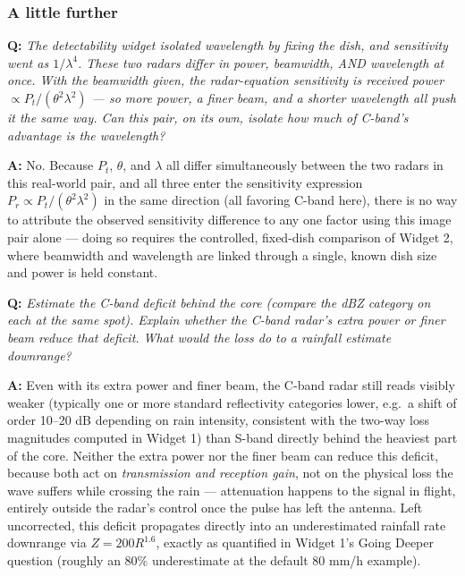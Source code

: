 \documentclass[11pt]{article}
\newenvironment{qa}[1]{\par\noindent\textbf{\color{qgray}Q: }\emph{#1}\par\noindent\textbf{A: }}{\par\vspace{6pt}}
\newcommand{\tier}[1]{\subsubsection*{#1}}
\begin{document}
\tier{A little further}
\begin{qa}{The detectability widget isolated wavelength by fixing the dish, and sensitivity went as $1/\lambda^4$. These two radars differ in power, beamwidth, AND wavelength at once. With the beamwidth given, the radar-equation sensitivity is received power $\propto P_t/(\theta^2\lambda^2)$ --- so more power, a finer beam, and a shorter wavelength all push it the same way. Can this pair, on its own, isolate how much of C-band's advantage is the wavelength?}
No. Because $P_t$, $\theta$, and $\lambda$ all differ simultaneously between the two radars in this real-world pair, and all three enter the sensitivity expression $P_r\propto P_t/(\theta^2\lambda^2)$ in the same direction (all favoring C-band here), there is no way to attribute the observed sensitivity difference to any one factor using this image pair alone --- doing so requires the controlled, fixed-dish comparison of Widget 2, where beamwidth and wavelength are linked through a single, known dish size and power is held constant.
\end{qa}
\begin{qa}{Estimate the C-band deficit behind the core (compare the dBZ category on each at the same spot). Explain whether the C-band radar's extra power or finer beam reduce that deficit. What would the loss do to a rainfall estimate downrange?}
Even with its extra power and finer beam, the C-band radar still reads visibly weaker (typically one or more standard reflectivity categories lower, e.g.\ a shift of order 10--20 dB depending on rain intensity, consistent with the two-way loss magnitudes computed in Widget 1) than S-band directly behind the heaviest part of the core. Neither the extra power nor the finer beam can reduce this deficit, because both act on \emph{transmission and reception gain}, not on the physical loss the wave suffers while crossing the rain --- attenuation happens to the signal in flight, entirely outside the radar's control once the pulse has left the antenna. Left uncorrected, this deficit propagates directly into an underestimated rainfall rate downrange via $Z=200R^{1.6}$, exactly as quantified in Widget 1's Going Deeper question (roughly an 80\% underestimate at the default 80 mm/h example).
\end{qa}
\end{document}
